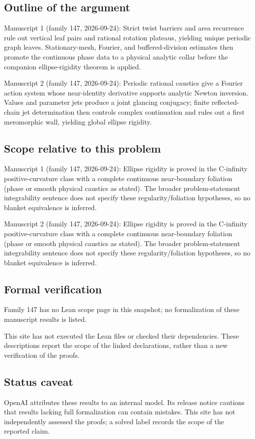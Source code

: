 \documentclass[11pt]{article}
\begin{document}
\subsection{Outline of the argument}
Manuscript 1 (family 147, 2026-09-24): Strict twist barriers and area recurrence rule out vertical leaf pairs and rational rotation plateaus, yielding unique periodic graph leaves. Stationary-mesh, Fourier, and buffered-division estimates then promote the continuous phase data to a physical analytic collar before the companion ellipse-rigidity theorem is applied.

Manuscript 2 (family 147, 2026-09-24): Periodic rational caustics give a Fourier action system whose near-identity derivative supports analytic Newton inversion. Values and parameter jets produce a joint glancing conjugacy; finite reflected-chain jet determination then controls complex continuation and rules out a first meromorphic wall, yielding global ellipse rigidity.

\subsection{Scope relative to this problem}
Manuscript 1 (family 147, 2026-09-24): Ellipse rigidity is proved in the C-infinity positive-curvature class with a complete continuous near-boundary foliation (phase or smooth physical caustics as stated). The broader problem-statement integrability sentence does not specify these regularity/foliation hypotheses, so no blanket equivalence is inferred.

Manuscript 2 (family 147, 2026-09-24): Ellipse rigidity is proved in the C-infinity positive-curvature class with a complete continuous near-boundary foliation (phase or smooth physical caustics as stated). The broader problem-statement integrability sentence does not specify these regularity/foliation hypotheses, so no blanket equivalence is inferred.

\subsection{Formal verification}
Family 147 has no Lean scope page in this snapshot; no formalization of these manuscript results is listed.

This site has not executed the Lean files or checked their dependencies. These descriptions report the scope of the linked declarations, rather than a new verification of the proofs.

\subsection{Status caveat}
OpenAI attributes these results to an internal model. Its release notice cautions that results lacking full formalization can contain mistakes. This site has not independently assessed the proofs; a solved label records the scope of the reported claim.
\end{document}
